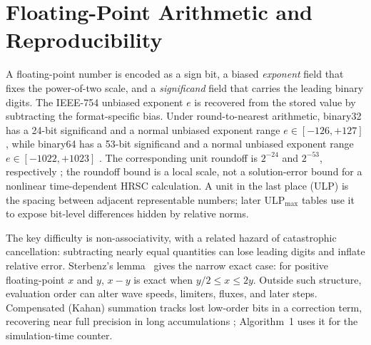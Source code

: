\section{Floating-Point Arithmetic and Reproducibility}
A floating-point number is encoded as a sign bit, a biased \emph{exponent}
field that fixes the power-of-two scale, and a \emph{significand} field that
carries the leading binary digits. The IEEE-754 unbiased exponent $e$ is
recovered from the stored value by subtracting the format-specific bias. Under round-to-nearest arithmetic, binary32 has a 24-bit significand and a normal unbiased exponent range $e \in [-126, +127]$, while binary64 has a 53-bit significand and a normal unbiased exponent range $e \in [-1022, +1023]$ \citep{ieee754_2019,goldberg_1991}. The corresponding
unit roundoff is \(2^{-24}\) and \(2^{-53}\), respectively
\citep{higham_2002}; the roundoff bound is a local scale, not a solution-error bound for a
nonlinear time-dependent HRSC calculation. A unit in the last place (ULP) is
the spacing between adjacent representable numbers; later
\(\mathrm{ULP}_{\max}\) tables use it to expose bit-level differences hidden
by relative norms.

The key difficulty is non-associativity, with a related hazard of catastrophic
cancellation: subtracting nearly equal quantities can lose leading digits and
inflate relative error. Sterbenz's lemma~\citep{sterbenz_1974} gives the narrow exact case: for
positive floating-point \(x\) and \(y\), \(x-y\) is exact when
\(y/2 \le x \le 2y\). Outside such structure, evaluation order can alter wave
speeds, limiters, fluxes, and later steps. Compensated (Kahan) summation tracks lost low-order bits in a
correction term, recovering near full precision in long accumulations
\citep{kahan_1965,higham_2002};
Algorithm~1 uses it for the simulation-time counter.

